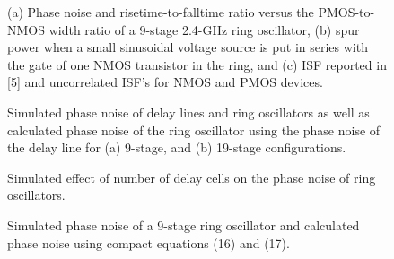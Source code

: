 \begin{figure}[htb]
\vspace{3in}
\vspace{3in}
\vspace{0.25in}
\vspace{2.3in}
\caption{(a) Phase noise and risetime-to-falltime ratio versus the PMOS-to-NMOS width ratio of a 9-stage 2.4-GHz ring oscillator, (b) spur power when a small sinusoidal voltage source is put in series with the gate of
one NMOS transistor in the ring, and (c) ISF reported in [5] and uncorrelated ISF's for NMOS and PMOS devices.}
\label{P2N}
\end{figure}

\begin{figure}[htb]
\vspace{3in}
\vspace{3in}
\vspace{0.25in}
\caption{Simulated phase noise of delay lines and ring oscillators as well as calculated phase noise of the ring oscillator using the phase noise of the delay line for (a)
9-stage, and (b) 19-stage configurations.}
\label{sim}
\end{figure}

\begin{figure}[htb]
\vspace{3in}
\caption{Simulated effect of number of delay cells on the phase noise of ring oscillators.}
\label{numberofstages}
\end{figure}

\begin{figure}[htb]
\vspace{3in}
\caption{Simulated phase noise of a 9-stage ring oscillator and calculated phase noise using compact equations (16) and (17).}
\label{compacteq}
\end{figure}

